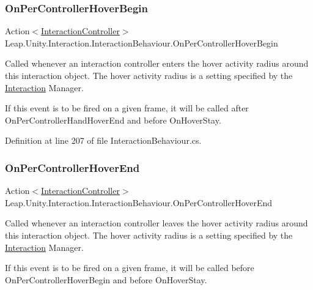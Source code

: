 \subsubsection{\texorpdfstring{OnPerControllerHoverBegin}{OnPerControllerHoverBegin}}
{\footnotesize\ttfamily Action$<$\mbox{\hyperlink{class_leap_1_1_unity_1_1_interaction_1_1_interaction_controller}{Interaction\+Controller}}$>$ Leap.\+Unity.\+Interaction.\+Interaction\+Behaviour.\+On\+Per\+Controller\+Hover\+Begin}



Called whenever an interaction controller enters the hover activity radius around this interaction object. The hover activity radius is a setting specified by the \mbox{\hyperlink{namespace_leap_1_1_unity_1_1_interaction}{Interaction}} Manager. 

If this event is to be fired on a given frame, it will be called after On\+Per\+Controller\+Hand\+Hover\+End and before On\+Hover\+Stay. 

Definition at line 207 of file Interaction\+Behaviour.\+cs.

\mbox{\label{class_leap_1_1_unity_1_1_interaction_1_1_interaction_behaviour_a407a2d69375e02173dedbd4475d983ce}} 
\subsubsection{\texorpdfstring{OnPerControllerHoverEnd}{OnPerControllerHoverEnd}}
{\footnotesize\ttfamily Action$<$\mbox{\hyperlink{class_leap_1_1_unity_1_1_interaction_1_1_interaction_controller}{Interaction\+Controller}}$>$ Leap.\+Unity.\+Interaction.\+Interaction\+Behaviour.\+On\+Per\+Controller\+Hover\+End}



Called whenever an interaction controller leaves the hover activity radius around this interaction object. The hover activity radius is a setting specified by the \mbox{\hyperlink{namespace_leap_1_1_unity_1_1_interaction}{Interaction}} Manager. 

If this event is to be fired on a given frame, it will be called before On\+Per\+Controller\+Hover\+Begin and before On\+Hover\+Stay. 

